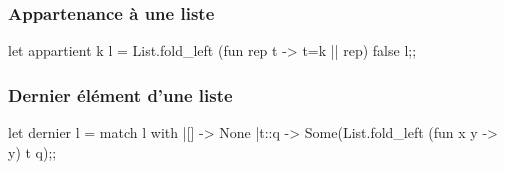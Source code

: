\subsubsection{Appartenance à une liste}
\begin{ocaml}
let appartient k l = 
   List.fold_left (fun rep t -> t=k || rep) false l;;
\end{ocaml}
\subsubsection{Dernier élément d'une liste}
\begin{ocaml}
let dernier l =
   match l with
   |[] -> None
   |t::q -> Some(List.fold_left (fun x y -> y) t q);;
\end{ocaml}

